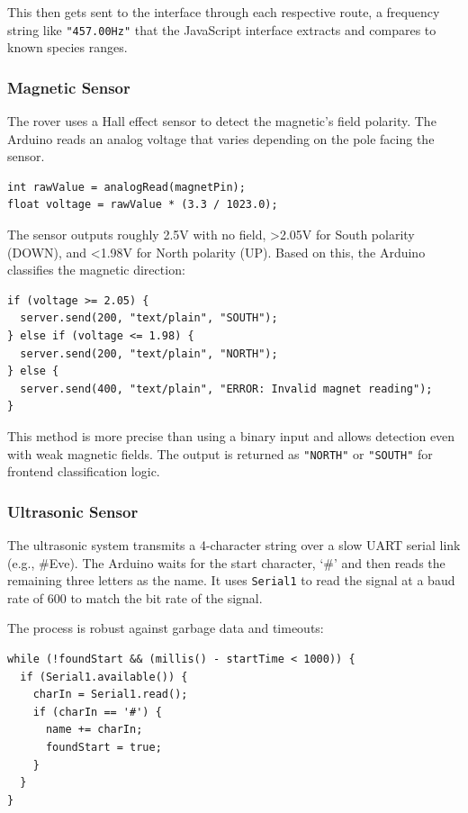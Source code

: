 This then gets sent to the interface through each respective route, a frequency string like \texttt{"457.00Hz"} that the JavaScript interface extracts and compares to known species ranges.

\subsubsection*{Magnetic Sensor}
The rover uses a Hall effect sensor to detect the magnetic's field polarity. The Arduino reads an analog voltage that varies depending on the pole facing the sensor.

\begin{verbatim}
int rawValue = analogRead(magnetPin);
float voltage = rawValue * (3.3 / 1023.0);
\end{verbatim}

The sensor outputs roughly 2.5V with no field, >2.05V for South polarity (DOWN), and <1.98V for North polarity (UP). Based on this, the Arduino classifies the magnetic direction:

\begin{verbatim}
if (voltage >= 2.05) {
  server.send(200, "text/plain", "SOUTH");
} else if (voltage <= 1.98) {
  server.send(200, "text/plain", "NORTH");
} else {
  server.send(400, "text/plain", "ERROR: Invalid magnet reading");
}
\end{verbatim}

This method is more precise than using a binary input and allows detection even with weak magnetic fields. The output is returned as \texttt{"NORTH"} or \texttt{"SOUTH"} for frontend classification logic.

\subsubsection*{Ultrasonic Sensor}
The ultrasonic system transmits a 4-character string over a slow UART serial link (e.g., \#Eve). The Arduino waits for the start character, ‘\#’ and then reads the remaining three letters as the name. It uses \texttt{Serial1} to read the signal at a baud rate of 600 to match the bit rate of the signal.

The process is robust against garbage data and timeouts:

\begin{verbatim}
while (!foundStart && (millis() - startTime < 1000)) {
  if (Serial1.available()) {
    charIn = Serial1.read();
    if (charIn == '#') {
      name += charIn;
      foundStart = true;
    }
  }
}
\end{verbatim}

